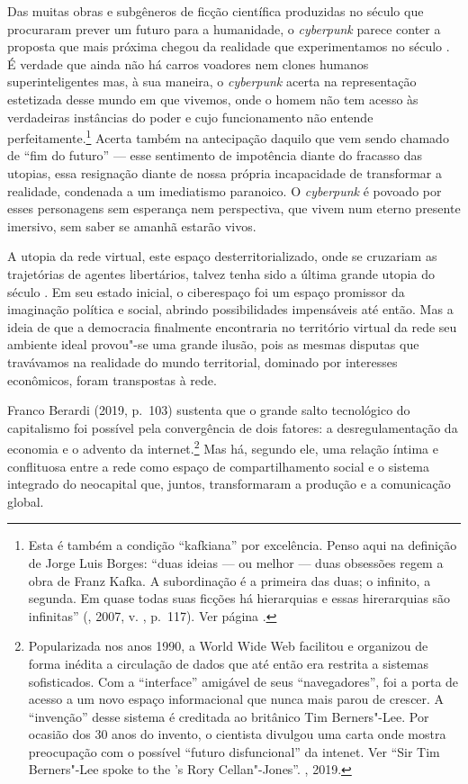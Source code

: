 Das muitas obras e subgêneros de ficção científica produzidas no século
 que procuraram prever um futuro para a humanidade, o \emph{cyberpunk}
parece conter a proposta que mais próxima chegou da realidade que experimentamos no
século . É verdade que ainda não há carros voadores nem clones
humanos superinteligentes mas, à sua maneira, o \emph{cyberpunk} acerta
na representação estetizada desse mundo em que vivemos, onde o homem não
tem acesso às verdadeiras instâncias do poder e cujo funcionamento não
entende perfeitamente.\footnote{Esta é também a condição ``kafkiana''
  por excelência. Penso aqui na definição de Jorge Luis Borges: ``duas
  ideias --- ou melhor --- duas obsessões regem a obra de Franz Kafka. A
  subordinação é a primeira das duas; o infinito, a segunda. Em quase
  todas suas ficções há hierarquias e essas hirerarquias são infinitas''
  (, 2007, v. , p.~117). Ver página \pageref{comando}.} Acerta também na antecipação daquilo que vem sendo chamado de
``fim do futuro'' --- esse sentimento de impotência diante do fracasso \label{fim}
das utopias, essa resignação diante de nossa própria incapacidade de
transformar a realidade, condenada a um imediatismo paranoico. O
\emph{cyberpunk} é povoado por esses personagens sem esperança nem
perspectiva, que vivem num eterno presente imersivo, sem saber se amanhã
estarão vivos.

A utopia da rede virtual, este espaço desterritorializado, onde se
cruzariam as trajetórias de agentes libertários, talvez tenha sido a
última grande utopia do século . Em seu estado inicial, o ciberespaço
foi um espaço promissor da imaginação política e social, abrindo
possibilidades impensáveis até então. Mas a ideia de que a democracia finalmente
encontraria no território virtual da rede seu ambiente ideal
provou"-se uma grande ilusão, pois as mesmas disputas que travávamos na
realidade do mundo territorial, dominado por interesses econômicos,
foram transpostas à rede.

Franco Berardi (2019, p.~103) sustenta que o grande salto tecnológico do
capitalismo foi possível pela convergência de dois fatores: a
desregulamentação da economia e o advento da internet.\footnote{Popularizada
  nos anos 1990, a World Wide Web facilitou e organizou de forma inédita
  a circulação de dados que até então era restrita a sistemas
  sofisticados. Com a ``interface'' amigável de seus ``navegadores'',
  foi a porta de acesso a um novo espaço informacional que nunca mais
  parou de crescer. A ``invenção'' desse sistema é creditada ao
  britânico Tim Berners"-Lee. Por ocasião dos 30 anos do invento, o
  cientista divulgou uma carta onde mostra preocupação com o possível
  ``futuro disfuncional'' da intenet. Ver ``Sir Tim Berners"-Lee spoke to
  the 's Rory Cellan"-Jones''. , 2019.} Mas há, segundo ele, uma relação íntima e
conflituosa entre a rede como espaço de compartilhamento social e o
sistema integrado do neocapital que, juntos, transformaram a produção e
a comunicação global.

